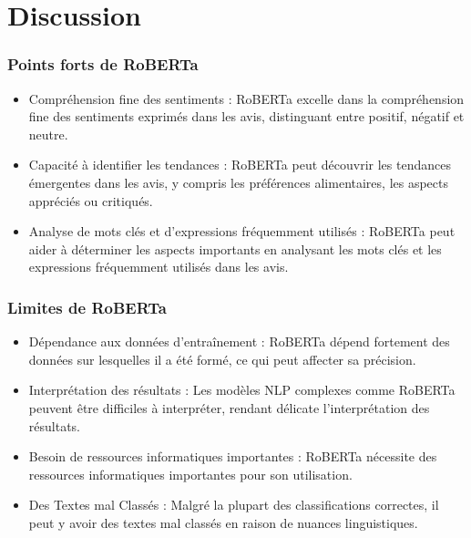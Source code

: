 \section{Discussion}

\begin{frame}
    \frametitle{Points forts de RoBERTa}
    \begin{itemize}
        \item Compréhension fine des sentiments : RoBERTa excelle dans la compréhension fine des sentiments exprimés dans les avis, distinguant entre positif, négatif et neutre.
        \item Capacité à identifier les tendances : RoBERTa peut découvrir les tendances émergentes dans les avis, y compris les préférences alimentaires, les aspects appréciés ou critiqués.
        \item Analyse de mots clés et d'expressions fréquemment utilisés : RoBERTa peut aider à déterminer les aspects importants en analysant les mots clés et les expressions fréquemment utilisés dans les avis.
    \end{itemize}
\end{frame}

\begin{frame}
    \frametitle{Limites de RoBERTa}
    \begin{itemize}
        \item Dépendance aux données d'entraînement : RoBERTa dépend fortement des données sur lesquelles il a été formé, ce qui peut affecter sa précision.
        \item Interprétation des résultats : Les modèles NLP complexes comme RoBERTa peuvent être difficiles à interpréter, rendant délicate l'interprétation des résultats.
        \item Besoin de ressources informatiques importantes : RoBERTa nécessite des ressources informatiques importantes pour son utilisation.
        \item Des Textes mal Classés : Malgré la plupart des classifications correctes, il peut y avoir des textes mal classés en raison de nuances linguistiques.
    \end{itemize}
\end{frame}

